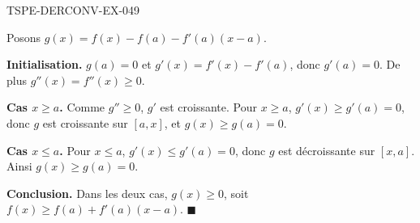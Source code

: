 \begin{corrige}{TSPE-DERCONV-EX-049}

Posons $g(x) = f(x) - f(a) - f'(a)(x - a)$.


\textbf{Initialisation.} $g(a) = 0$ et $g'(x) = f'(x) - f'(a)$, donc $g'(a) = 0$. De plus $g''(x) = f''(x) \geq 0$.

\textbf{Cas $x \geq a$.} Comme $g'' \geq 0$, $g'$ est croissante. Pour $x \geq a$, $g'(x) \geq g'(a) = 0$, donc $g$ est croissante sur $[a, x]$, et $g(x) \geq g(a) = 0$.

\textbf{Cas $x \leq a$.} Pour $x \leq a$, $g'(x) \leq g'(a) = 0$, donc $g$ est décroissante sur $[x, a]$. Ainsi $g(x) \geq g(a) = 0$.

\textbf{Conclusion.} Dans les deux cas, $g(x) \geq 0$, soit $f(x) \geq f(a) + f'(a)(x - a)$. $\blacksquare$

\end{corrige}
